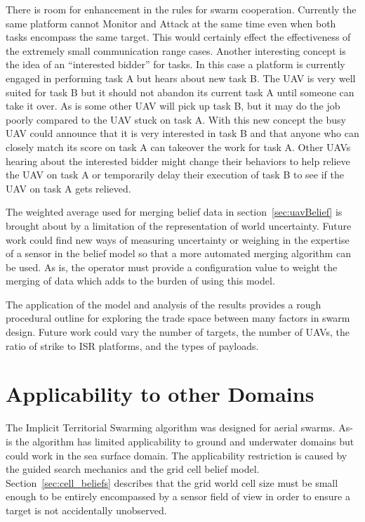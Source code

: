 There is room for enhancement in the rules for swarm cooperation.  Currently the same platform cannot Monitor and Attack at the same time even when both tasks encompass the same target.  This would certainly effect the effectiveness of the extremely small communication range cases.  Another interesting concept is the idea of an ``interested bidder'' for tasks.  In this case a platform is currently engaged in performing task A but hears about new task B.  The UAV is very well suited for task B but it should not abandon its current task A until someone can take it over.  As is some other UAV will pick up task B, but it may do the job poorly compared to the UAV stuck on task A.  With this new concept the busy UAV could announce that it is very interested in task B and that anyone who can closely match its score on task A can takeover the work for task A.  Other UAVs hearing about the interested bidder might change their behaviors to help relieve the UAV on task A or temporarily delay their execution of task B to see if the UAV on task A gets relieved.

The weighted average used for merging belief data in section~\ref{sec:uavBelief} is brought about by a limitation of the representation of world uncertainty.  Future work could find new ways of measuring uncertainty or weighing in the expertise of a sensor in the belief model so that a more automated merging algorithm can be used.  As is, the operator must provide a configuration value to weight the merging of data which adds to the burden of using this model.

The application of the model and analysis of the results provides a rough procedural outline for exploring the trade space between many factors in swarm design.  Future work could vary the number of targets, the number of UAVs, the ratio of strike to ISR platforms, and the types of payloads.

\section{Applicability to other Domains}
The Implicit Territorial Swarming algorithm was designed for aerial swarms.  As-is the algorithm has limited applicability to ground and underwater domains but could work in the sea surface domain.  The applicability restriction is caused by the guided search mechanics and the grid cell belief model.  Section~\ref{sec:cell_beliefs} describes that the grid world cell size must be small enough to be entirely encompassed by a sensor field of view in order to ensure a target is not accidentally unobserved.

